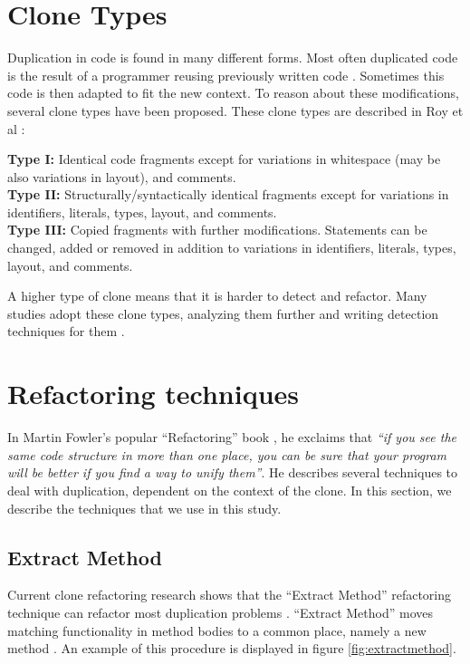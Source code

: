 \section{Clone Types} \label{chap:backgroundclonetypes}
Duplication in code is found in many different forms. Most often duplicated code is the result of a programmer reusing previously written code \cite{haefliger2008code, baxter1998clone}. Sometimes this code is then adapted to fit the new context. To reason about these modifications, several clone types have been proposed. These clone types are described in Roy et al \cite{roy2007survey}:
\begin{displayquote}
\textbf{Type I:} Identical code fragments except for variations in whitespace (may be also variations in layout), and comments.\\
\textbf{Type II:} Structurally/syntactically identical fragments except for variations in identifiers, literals, types, layout, and comments.\\
\textbf{Type III:} Copied fragments with further modifications. Statements can be changed, added or removed in addition to variations in identifiers, literals, types, layout, and comments.
\end{displayquote}
A higher type of clone means that it is harder to detect and refactor. Many studies adopt these clone types, analyzing them further and writing detection techniques for them \cite{sajnani2016sourcerercc, kodhai2010detection, van2019novel}.

\section{Refactoring techniques}
In Martin Fowler's popular ``Refactoring'' book \cite{fowler2018refactoring}, he exclaims that \textit{``if you see the same code structure in more than one place, you can be sure that your program will be better if you find a way to unify them''}. He describes several techniques to deal with duplication, dependent on the context of the clone. In this section, we describe the techniques that we use in this study.

\subsection{Extract Method}
Current clone refactoring research shows that the ``Extract Method'' refactoring technique can refactor most duplication problems \cite{fontana2015duplicated, tsantalis2015assessing, white2016deep}. ``Extract Method'' moves matching functionality in method bodies to a common place, namely a new method \cite{fowler2018refactoring}. An example of this procedure is displayed in figure \ref{fig:extractmethod}.

